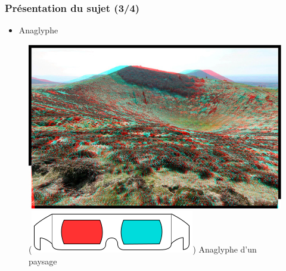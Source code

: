 \documentclass{beamer}
\begin{document}
\begin{frame}

\frametitle{Présentation du sujet (3/4)}

\begin{itemize}[label=$\bullet$]
\item Anaglyphe
\end{itemize}
\begin{figure}
\centering
\includegraphics[scale=0.4]{anaglyphe-cratere-puy.jpg} %
\caption{(\includegraphics[scale=0.1]{lunettes.png}) Anaglyphe d'un paysage \footnotemark}
\end{figure}

\end{frame}


\end{document}
